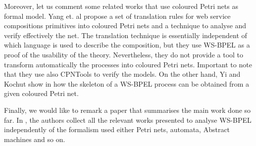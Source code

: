 Moreover, let us comment some related works that use coloured Petri nets as formal model. 
Yang et. al \cite{Yang2006} propose a set of translation rules for web service compositions primitives
into coloured Petri nets and a technique to analyse and verify
effectively the net. The translation
technique is essentially independent of which language is used to describe
the composition, but they use WS-BPEL as a proof of the usability of the theory. Nevertheless, they do not provide a tool to
transform automatically the processes into coloured Petri nets. Important to note that they use also CPNTools to verify the models.
On the other hand, Yi and Kochut show in \cite{Yi2004} how the skeleton of a WS-BPEL
process can be obtained from a given coloured Petri net. 

Finally, we would like to remark a paper that summarises the main work done so far.
In \cite{Breugel}, the authors collect all the relevant works presented to analyse WS-BPEL 
independently of the formalism used either Petri nets, automata, Abstract machines and so on.


